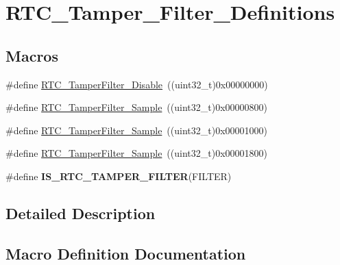 \hypertarget{group___r_t_c___tamper___filter___definitions}{}\section{R\+T\+C\+\_\+\+Tamper\+\_\+\+Filter\+\_\+\+Definitions}
\label{group___r_t_c___tamper___filter___definitions}
\subsection*{Macros}
\begin{DoxyCompactItemize}
\item 
\#define \hyperlink{group___r_t_c___tamper___filter___definitions_ga606745baf6ebc29dec3ab8f4af69f9e7}{R\+T\+C\+\_\+\+Tamper\+Filter\+\_\+\+Disable}~((uint32\+\_\+t)0x00000000)
\item 
\#define \hyperlink{group___r_t_c___tamper___filter___definitions_gae036968e2f4d9ed7d71587df94bd2f41}{R\+T\+C\+\_\+\+Tamper\+Filter\+\_\+Sample}~((uint32\+\_\+t)0x00000800)
\item 
\#define \hyperlink{group___r_t_c___tamper___filter___definitions_ga1d36f9a5326a4ed71de0f28365ee65e6}{R\+T\+C\+\_\+\+Tamper\+Filter\+\_\+Sample}~((uint32\+\_\+t)0x00001000)
\item 
\#define \hyperlink{group___r_t_c___tamper___filter___definitions_gae84bc688a4eca9fd17ece6df6436c9ca}{R\+T\+C\+\_\+\+Tamper\+Filter\+\_\+Sample}~((uint32\+\_\+t)0x00001800)
\item 
\#define {\bfseries I\+S\+\_\+\+R\+T\+C\+\_\+\+T\+A\+M\+P\+E\+R\+\_\+\+F\+I\+L\+T\+E\+R}(F\+I\+L\+T\+E\+R)
\end{DoxyCompactItemize}


\subsection{Detailed Description}


\subsection{Macro Definition Documentation}
\hypertarget{group___r_t_c___tamper___filter___definitions_gaa695f102d84ff00aef2b7539f1293b00}{}
